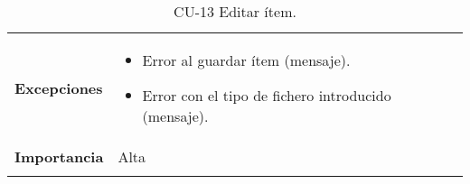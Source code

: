 \begin{longtable}[]{@{}ll@{}}
\begin{minipage}[t]{0.15\columnwidth}
\textbf{Excepciones}\strut
\end{minipage} & \begin{minipage}[t]{0.79\columnwidth}\raggedright
\begin{itemize}
\tightlist
\item
  Error al guardar ítem (mensaje).
\item
  Error con el tipo de fichero introducido (mensaje).
\end{itemize}\strut
\end{minipage}\tabularnewline
\begin{minipage}[t]{0.15\columnwidth}\raggedright
\textbf{Importancia}\strut
\end{minipage} & \begin{minipage}[t]{0.79\columnwidth}\raggedright
Alta\strut
\end{minipage}\tabularnewline
\bottomrule
\caption{CU-13 Editar ítem.}
\end{longtable}

